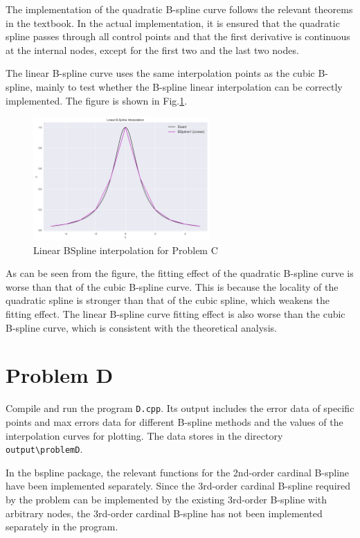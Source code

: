 \documentclass[a4paper]{article}
\begin{document}
\begin{sloppypar}
The implementation of the quadratic B-spline curve follows the relevant
theorems in the textbook. In the actual implementation, it is ensured that the
quadratic spline passes through all control points and that the first
derivative is continuous at the internal nodes, except for the first two and
the last two nodes.

The linear B-spline curve uses the same interpolation points as the cubic
B-spline, mainly to test whether the B-spline linear interpolation can be
correctly implemented. The figure is shown in
Fig.\ref{fig:Linear_BSpline_interpolation_C}.

\begin{figure}[H]
  \centering
  \includegraphics[width=0.6\textwidth]{../figure/problemC/Linear_BSpline_interpolation.png}
  \renewcommand{\figurename}{Fig.}
  \caption{Linear BSpline interpolation for Problem C}
  \label{fig:Linear_BSpline_interpolation_C}
\end{figure}

As can be seen from the figure, the fitting effect of the quadratic B-spline
curve is worse than that of the cubic B-spline curve. This is because the
locality of the quadratic spline is stronger than that of the cubic spline,
which weakens the fitting effect. The linear B-spline curve fitting effect is
also worse than the cubic B-spline curve, which is consistent with the
theoretical analysis.

\section{Problem D}
Compile and run the program \verb|D.cpp|. Its output includes the error data of specific points and max errors data for different B-spline methods and the values of the interpolation curves for plotting. The data stores in the directory \verb|output\problemD|.

In the bspline package, the relevant functions for the 2nd-order cardinal
B-spline have been implemented separately. Since the 3rd-order cardinal
B-spline required by the problem can be implemented by the existing 3rd-order
B-spline with arbitrary nodes, the 3rd-order cardinal B-spline has not been
implemented separately in the program.


\end{sloppypar}
\end{document}
